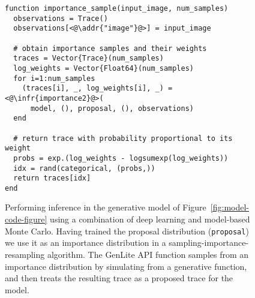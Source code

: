 \begin{figure}[t]
\begin{minipage}[t]{0.55\textwidth}
\begin{lstlisting}
function importance_sample(input_image, num_samples)
  observations = Trace()
  observations[<@\addr{"image"}@>] = input_image

  # obtain importance samples and their weights
  traces = Vector{Trace}(num_samples)
  log_weights = Vector{Float64}(num_samples)
  for i=1:num_samples
    (traces[i], _, log_weights[i], _) = <@\infr{importance2}@>(
      model, (), proposal, (), observations)
  end

  # return trace with probability proportional to its weight
  probs = exp.(log_weights - logsumexp(log_weights))
  idx = rand(categorical, (probs,))
  return traces[idx]
end
\end{lstlisting}
\end{minipage}
\caption{
Performing inference in the generative model of Figure~\ref{fig:model-code-figure} using a combination of deep learning and model-based Monte Carlo.
Having trained the proposal distribution (\texttt{proposal}) we use it as an importance distribution in a sampling-importance-resampling algorithm.
The GenLite API function  samples from an importance distribution by simulating from a generative function, and then treats the resulting trace as a proposed trace for the model.
}
\label{fig:inference-code-figure}
\end{figure}
